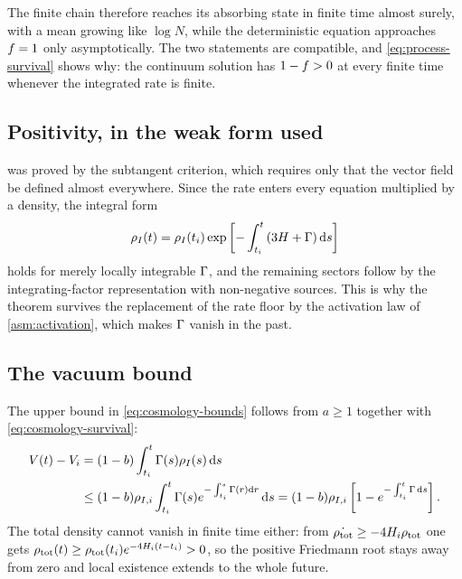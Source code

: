 The finite chain therefore reaches its absorbing state in finite time almost
surely, with a mean growing like $\log N$, while the deterministic equation
approaches $f=1$ only asymptotically. The two statements are compatible,
and \cref{eq:process-survival} shows why: the continuum solution has
$1-f>0$ at every finite time whenever the integrated rate is finite.

\subsection{Positivity, in the weak form used}\label{app:proofs-positivity}

 was proved by the subtangent criterion, which
requires only that the vector field be defined almost everywhere. Since the
rate enters every equation multiplied by a density, the integral form
%
\begin{equation}\label{eq:appb-integral}
  \rho_{I}(t)=\rho_{I}(t_i)\exp\left[-\int_{t_i}^{t}\left(3H+\Gamma\right)\mathrm{d} s\right]
\end{equation}
%
holds for merely locally integrable $\Gamma$, and the remaining sectors follow by
the integrating-factor representation with non-negative sources. This is why
the theorem survives the replacement of the rate floor by the activation law of
\cref{asm:activation}, which makes $\Gamma$ vanish in the past.

\subsection{The vacuum bound}\label{app:proofs-vacuum-bound}

The upper bound in \cref{eq:cosmology-bounds} follows from
$a\ge1$ together with \cref{eq:cosmology-survival}:
%
\begin{equation}\label{eq:appb-vacuum}
  \begin{aligned}
    V(t)-V_i
    &=(1-b)\int_{t_i}^{t}\Gamma(s)\rho_{I}(s)\,\mathrm{d} s\\
    &\le(1-b)\rho_{I,i}\int_{t_i}^{t}\Gamma(s)
      e^{-\int_{t_i}^{s}\Gamma(r)\mathrm{d} r}\,\mathrm{d} s
    =(1-b)\rho_{I,i}\left[1-e^{-\int_{t_i}^{t}\Gamma\,\mathrm{d} s}\right] .
  \end{aligned}
\end{equation}
%
The total density cannot vanish in finite time either: from
$\dot{\rho_{\mathrm{tot}}}\ge-4H_i\rho_{\mathrm{tot}}$ one gets
$\rho_{\mathrm{tot}}(t)\ge\rho_{\mathrm{tot}}(t_i)e^{-4H_i(t-t_i)}>0$, so the positive Friedmann
root stays away from zero and local existence extends to the whole future.
